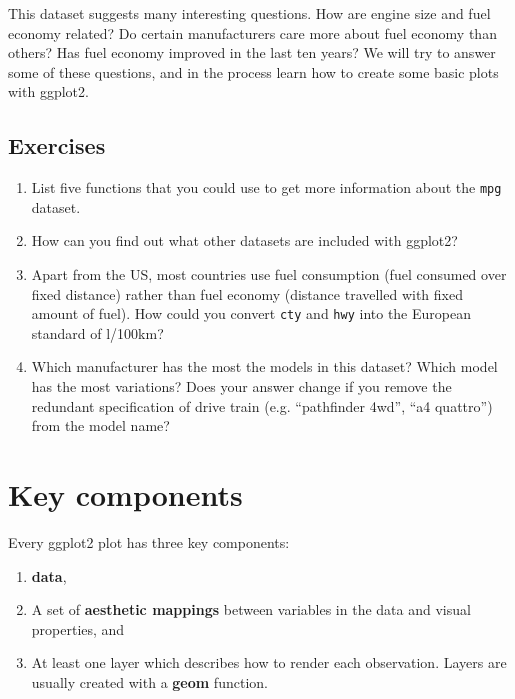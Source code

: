 This dataset suggests many interesting questions. How are engine size
and fuel economy related? Do certain manufacturers care more about fuel
economy than others? Has fuel economy improved in the last ten years? We
will try to answer some of these questions, and in the process learn how
to create some basic plots with ggplot2.

\hypertarget{exercises}{%
\subsection{Exercises}\label{exercises}}

\begin{enumerate}
\def\labelenumi{\arabic{enumi}.}
\item
  List five functions that you could use to get more information about
  the \texttt{mpg} dataset.
\item
  How can you find out what other datasets are included with ggplot2?
\item
  Apart from the US, most countries use fuel consumption (fuel consumed
  over fixed distance) rather than fuel economy (distance travelled with
  fixed amount of fuel). How could you convert \texttt{cty} and
  \texttt{hwy} into the European standard of l/100km?
\item
  Which manufacturer has the most the models in this dataset? Which
  model has the most variations? Does your answer change if you remove
  the redundant specification of drive train (e.g. ``pathfinder 4wd'',
  ``a4 quattro'') from the model name?
\end{enumerate}

\hypertarget{sec:basic-use}{%
\section{Key components}\label{sec:basic-use}}

Every ggplot2 plot has three key components:

\begin{enumerate}
\def\labelenumi{\arabic{enumi}.}
\item
  \textbf{data},
\item
  A set of \textbf{aesthetic mappings} between variables in the data and
  visual properties, and
\item
  At least one layer which describes how to render each observation.
  Layers are usually created with a \textbf{geom} function.
\end{enumerate}

